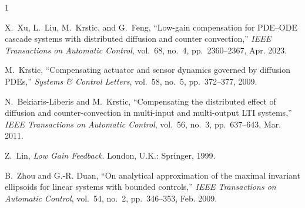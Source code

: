 \documentclass[journal]{IEEEtran}
\begin{document}
\begin{thebibliography}{1}

X.~Xu, L.~Liu, M.~Krstic, and G.~Feng, ``Low-gain compensation for PDE--ODE cascade systems with distributed diffusion and counter convection,'' \emph{IEEE Transactions on Automatic Control}, vol.~68, no.~4, pp.~2360--2367, Apr. 2023.

M.~Krstic, ``Compensating actuator and sensor dynamics governed by diffusion PDEs,'' \emph{Systems \& Control Letters}, vol.~58, no.~5, pp.~372--377, 2009.

N.~Bekiaris-Liberis and M.~Krstic, ``Compensating the distributed effect of diffusion and counter-convection in multi-input and multi-output LTI systems,'' \emph{IEEE Transactions on Automatic Control}, vol.~56, no.~3, pp.~637--643, Mar. 2011.

Z.~Lin, \emph{Low Gain Feedback}. London, U.K.: Springer, 1999.

B.~Zhou and G.-R. Duan, ``On analytical approximation of the maximal invariant ellipsoids for linear systems with bounded controls,'' \emph{IEEE Transactions on Automatic Control}, vol.~54, no.~2, pp.~346--353, Feb. 2009.

\end{thebibliography}
\end{document}
